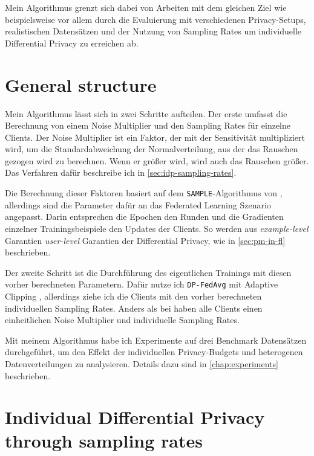 Mein Algorithmus grenzt sich dabei von Arbeiten mit dem gleichen Ziel wie beispielsweise \textcite{aldaghri:2023} vor allem durch die Evaluierung mit verschiedenen Privacy-Setups, realistischen Datensätzen und der Nutzung von Sampling Rates um individuelle Differential Privacy zu erreichen ab.

\section{General structure}
Mein Algorithmus lässt sich in zwei Schritte aufteilen. Der erste umfasst die Berechnung von einem Noise Multiplier und den Sampling Rates für einzelne Clients. Der Noise Multiplier ist ein Faktor, der mit der Sensitivität multipliziert wird, um die Standardabweichung der Normalverteilung, aus der das Rauschen gezogen wird zu berechnen. Wenn er größer wird, wird auch das Rauschen größer. Das Verfahren dafür beschreibe ich in \autoref{sec:idp-sampling-rates}. 

Die Berechnung dieser Faktoren basiert auf dem \texttt{SAMPLE}-Algorithmus von \textcite{boenisch:2023}, allerdings sind die Parameter dafür an das Federated Learning Szenario angepasst. Darin entsprechen die Epochen den Runden und die Gradienten einzelner Trainingsbeispiele den Updates der Clients. So werden aus \textit{example-level} Garantien \textit{user-level} Garantien der Differential Privacy, wie in \autoref{sec:pm-in-fl} beschrieben.

Der zweite Schritt ist die Durchführung des eigentlichen Trainings mit diesen vorher berechneten Parametern. Dafür nutze ich \texttt{DP-FedAvg} mit Adaptive Clipping \cite{andrew:2021}, allerdings ziehe ich die Clients mit den vorher berechneten individuellen Sampling Rates. Anders als bei \citeauthor{aldaghri:2023} haben alle Clients einen einheitlichen Noise Multiplier und individuelle Sampling Rates.

Mit meinem Algorithmus habe ich Experimente auf drei Benchmark Datensätzen durchgeführt, um den Effekt der individuellen Privacy-Budgets und heterogenen Datenverteilungen zu analysieren. Details dazu sind in \autoref{chap:experiments} beschrieben.

\section{Individual Differential Privacy through sampling rates}\label{sec:idp-sampling-rates}

